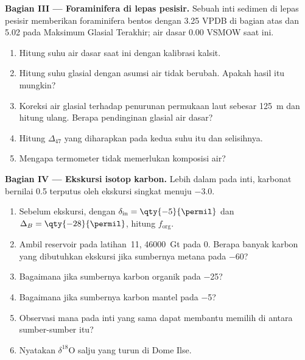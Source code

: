 \begin{problem}
\medskip\noindent\textbf{Bagian III --- Foraminifera di lepas pesisir.} Sebuah
inti sedimen di lepas pesisir memberikan foraminifera bentos dengan \qty{3.25}{\permil}
VPDB di bagian atas dan \qty{5.02}{\permil} pada Maksimum Glasial Terakhir; air dasar
\qty{0.00}{\permil} VSMOW saat ini.
\begin{enumerate}[resume]
\item Hitung suhu air dasar saat ini dengan
kalibrasi kalsit.
\item Hitung suhu glasial dengan asumsi air tidak berubah. Apakah
hasil itu mungkin?
\item Koreksi air glasial terhadap penurunan permukaan laut sebesar \qty{125}{m} dan
hitung ulang. Berapa pendinginan glasial air dasar?
\item Hitung $\Delta_{47}$ yang diharapkan pada kedua suhu itu dan
selisihnya.
\item Mengapa termometer  tidak memerlukan komposisi
air?
\end{enumerate}

\medskip\noindent\textbf{Bagian IV --- Ekskursi isotop karbon.} Lebih dalam pada inti,
karbonat bernilai \qty{+0.5}{\permil} terputus oleh ekskursi singkat menuju
\qty{-3.0}{\permil}.
\begin{enumerate}[resume]
\item Sebelum ekskursi, dengan $\delta_{\mathrm{in}} = \qty{-5}{\permil}$ dan
$\Delta_B = \qty{-28}{\permil}$, hitung $f_{\mathrm{org}}$.
\item Ambil reservoir pada latihan~11, \qty{46000}{Gt} pada 0. Berapa banyak karbon
yang dibutuhkan ekskursi jika sumbernya metana pada \qty{-60}{\permil}?
\item Bagaimana jika sumbernya karbon organik pada \qty{-25}{\permil}?
\item Bagaimana jika sumbernya karbon mantel pada \qty{-5}{\permil}?
\item Observasi mana pada inti yang sama dapat membantu memilih di antara
sumber-sumber itu?
\item Nyatakan $\delta^{18}\mathrm O$ salju yang turun di Dome Ilse.
\end{enumerate}
\end{problem}
